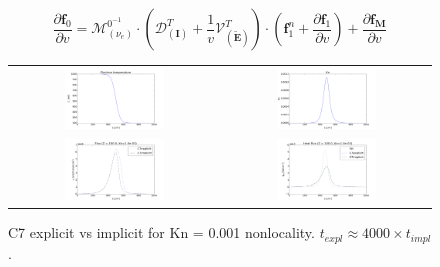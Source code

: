 \documentclass[preprint,12pt]{elsarticle}
\newcommand{\pdv}[2]{\frac{\partial{#1}}{\partial{#2}}}
\newcommand{\vect}[1]{\boldsymbol{#1}}
\newcommand{\matr}[1]{\mathbf{#1}}
\newcommand{\nue}{\nu_{e}}
\newcommand{\vmag}{v}
\newcommand{\tE}{\vect{\tilde{E}}}
\newcommand{\fM}{f_M}
\newcommand{\vfzero}{\vect{f}_0}
\newcommand{\fone}{\vect{f}_1}
\newcommand{\MI}{\matr{I}}
\newcommand{\IM}{\boldsymbol{\mathcal{M}}}
\newcommand{\ID}{\boldsymbol{\mathcal{D}}}
\newcommand{\IV}{\boldsymbol{\mathcal{V}}}
\begin{document}
\begin{equation}
  \pdv{\vfzero}{\vmag}  
  = 
  \IM^{0^{-1}}_{(\nue)}\cdot
  \left(\ID^T_{\left(\MI\right)} + 
  \frac{1}{\vmag}\IV^T_{\left(\tE\right)}\right) \cdot 
  \left(\fone^n + \pdv{\fone}{\vmag}\right)
  + \pdv{\vect{\fM}}{\vmag}
  \label{eq:implicitdf0dv}
\end{equation}


\cite{Dobrev_Kolev_Rieben-High-order_curvilinear_finite_element_methods_for_Lagrangian_hydrodynamics}

\begin{figure}[tbh]
  \begin{center}
    \begin{tabular}{cc}
      \includegraphics[width=0.5\textwidth]{../results/fe_analysis/figs/P5_temperature.png} &
      \includegraphics[width=0.5\textwidth]{../results/fe_analysis/figs/P5_niZ100_Kn1e-3_implexpl.png} \\
       \includegraphics[width=0.5\textwidth]{../results/fe_analysis/figs/P5_fluxes_niZ100_Kn1e-3_implexpl.png} &
      \includegraphics[width=0.5\textwidth]{../results/fe_analysis/figs/P5_heatfluxes_niZ100_Kn1e-3_implexpl.png}     
    \end{tabular}
  \caption{
  C7 explicit vs implicit for Kn = 0.001 nonlocality. $t_{expl} \approx 4000\times t_{impl}$.
  }
  \end{center}
  \label{fig:C7explimpl}
\end{figure}
\end{document}
